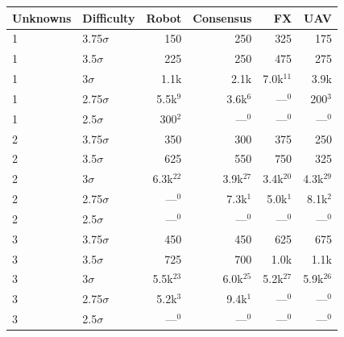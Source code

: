 \begin{tabular}{@{}llrrrr@{}}
\toprule
Unknowns & Difficulty & Robot & Consensus & FX & UAV\\
\midrule
1 & 3.75$\sigma$ & 150 & 250 & 325 & 175\\
1 & 3.5$\sigma$ & 225 & 250 & 475 & 275\\
1 & 3$\sigma$ & 1.1k & 2.1k & 7.0k$^{11}$ & 3.9k\\
1 & 2.75$\sigma$ & 5.5k$^{9}$ & 3.6k$^{6}$ & ---$^{0}$ & 200$^{3}$\\
1 & 2.5$\sigma$ & 300$^{2}$ & ---$^{0}$ & ---$^{0}$ & ---$^{0}$\\
\midrule
2 & 3.75$\sigma$ & 350 & 300 & 375 & 250\\
2 & 3.5$\sigma$ & 625 & 550 & 750 & 325\\
2 & 3$\sigma$ & 6.3k$^{22}$ & 3.9k$^{27}$ & 3.4k$^{20}$ & 4.3k$^{29}$\\
2 & 2.75$\sigma$ & ---$^{0}$ & 7.3k$^{1}$ & 5.0k$^{1}$ & 8.1k$^{2}$\\
2 & 2.5$\sigma$ & ---$^{0}$ & ---$^{0}$ & ---$^{0}$ & ---$^{0}$\\
\midrule
3 & 3.75$\sigma$ & 450 & 450 & 625 & 675\\
3 & 3.5$\sigma$ & 725 & 700 & 1.0k & 1.1k\\
3 & 3$\sigma$ & 5.5k$^{23}$ & 6.0k$^{25}$ & 5.2k$^{27}$ & 5.9k$^{26}$\\
3 & 2.75$\sigma$ & 5.2k$^{3}$ & 9.4k$^{1}$ & ---$^{0}$ & ---$^{0}$\\
3 & 2.5$\sigma$ & ---$^{0}$ & ---$^{0}$ & ---$^{0}$ & ---$^{0}$\\
\bottomrule
\end{tabular}
